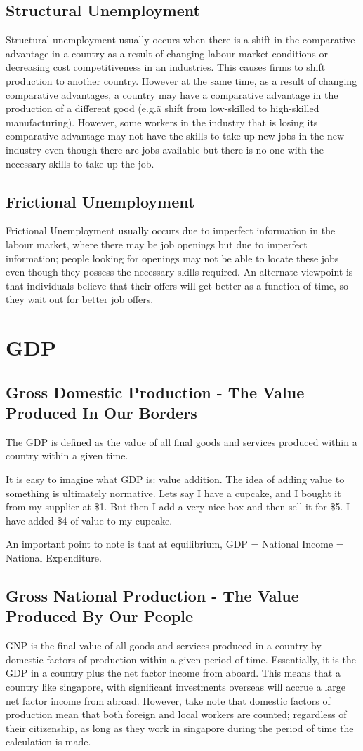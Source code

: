 \subsection{Structural Unemployment}
Structural unemployment usually occurs when there is a shift in the comparative advantage in a country as a result of changing labour market conditions or decreasing cost competitiveness in an industries. This causes firms to shift production to another country. However at the same time, as a result of changing comparative advantages, a country may have a comparative advantage in the production of a different good (e.g.\~a shift from low-skilled to high-skilled manufacturing). However, some workers in the industry that is losing its comparative advantage may not have the skills to take up new jobs in the new industry even though there are jobs available but there is no one with the necessary skills to take up the job.
\subsection{Frictional Unemployment}
Frictional Unemployment usually occurs due to imperfect information in the labour market, where there may be job openings but due to imperfect information; people looking for openings may not be able to locate these jobs even though they possess the necessary skills required. An alternate viewpoint is that individuals believe that their offers will get better as a function of time, so they wait out for better job offers.
\section{GDP}
\subsection{Gross Domestic Production - The Value Produced In Our Borders}
The GDP is defined as the value of all final goods and services produced within a country within a given time.
 
It is easy to imagine what GDP is: value addition. The idea of adding value to something is ultimately normative. Lets say I have a cupcake, and I bought it from my supplier at \$1. But then I add a very nice box and then sell it for \$5. I have added \$4 of value to my cupcake. 
 
An important point to note is that at equilibrium, GDP = National Income = National Expenditure.
\subsection{Gross National Production - The Value Produced By Our People}
GNP is the final value of all goods and services produced in a country by domestic factors of production within a given period of time. Essentially, it is the GDP in a country plus the net factor income from aboard. This means that a country like singapore, with significant investments overseas will accrue a large net factor income from abroad. However, take note that domestic factors of production mean that both foreign and local workers are counted; regardless of their citizenship, as long as they work in singapore during the period of time the calculation is made.
